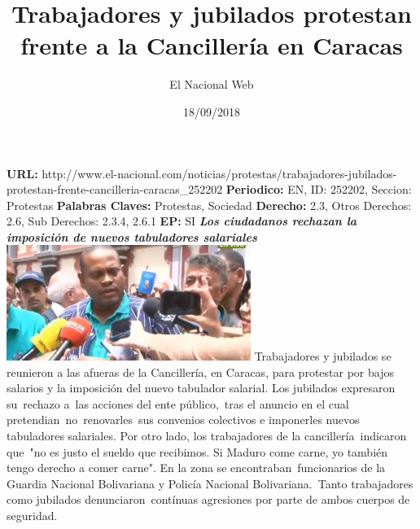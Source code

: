 \documentclass{article}%
\title{\textbf{Trabajadores y jubilados protestan frente a la Cancillería en Caracas}}%
\author{El Nacional Web}%
\date{18/09/2018}%
\begin{document}
%
\normalsize%
\maketitle%
\textbf{URL: }%
http://www.el{-}nacional.com/noticias/protestas/trabajadores{-}jubilados{-}protestan{-}frente{-}cancilleria{-}caracas\_252202\newline%
%
\textbf{Periodico: }%
EN, %
ID: %
252202, %
Seccion: %
Protestas\newline%
%
\textbf{Palabras Claves: }%
Protestas, Sociedad\newline%
%
\textbf{Derecho: }%
2.3, %
Otros Derechos: %
2.6, %
Sub Derechos: %
2.3.4, 2.6.1\newline%
%
\textbf{EP: }%
SI\newline%
\newline%
%
\textbf{\textit{Los ciudadanos rechazan la imposición de nuevos tabuladores salariales}}%
\newline%
\newline%
%
\includegraphics[width=300px]{264.jpg}%
\newline%
%
Trabajadores y jubilados se reunieron a las afueras de la Cancillería, en Caracas, para protestar por bajos salarios y la imposición del nuevo tabulador salarial.%
\newline%
%
Los jubilados expresaron su~rechazo a~las acciones del ente público,~tras el anuncio en el cual pretendian~no~renovarles~sus convenios colectivos e imponerles nuevos tabuladores salariales.%
\newline%
%
Por otro lado, los trabajadores de la cancillería~indicaron que~"no es justo el sueldo que recibimos. Si Maduro come carne, yo también tengo derecho a comer carne".%
\newline%
%
En la zona se encontraban~funcionarios de la Guardia Nacional Bolivariana y Policía Nacional Bolivariana.~Tanto trabajadores como jubilados denunciaron~contínuas agresiones por parte de ambos cuerpos de seguridad.%
\newline%
%
\end{document}
